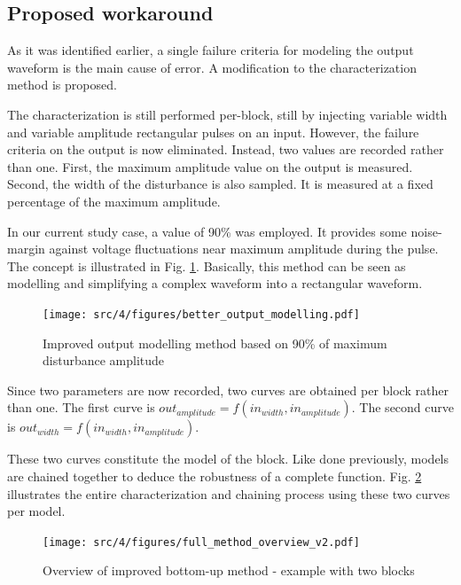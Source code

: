 \subsection{Proposed workaround}

As it was identified earlier, a single failure criteria for modeling the output waveform is the main cause of error.
A modification to the characterization method is proposed.

The characterization is still performed per-block, still by injecting variable width and variable amplitude rectangular pulses on an input.
However, the failure criteria on the output is now eliminated.
Instead, two values are recorded rather than one.
First, the maximum amplitude value on the output is measured.
Second, the width of the disturbance is also sampled.
It is measured at a fixed percentage of the maximum amplitude.

In our current study case, a value of 90\% was employed.
It provides some noise-margin against voltage fluctuations near maximum amplitude during the pulse.
The concept is illustrated in Fig. \ref{fig:impact-single-failure-criteria}.
Basically, this method can be seen as modelling and simplifying a complex waveform into a rectangular waveform.

\begin{figure}[!h]
  \centering
  \texttt{[image: src/4/figures/better\_output\_modelling.pdf]}
  \caption{Improved output modelling method based on 90\% of maximum disturbance amplitude}
  \label{fig:impact-single-failure-criteria}
\end{figure}

Since two parameters are now recorded, two curves are obtained per block rather than one.
The first curve is $out_{amplitude} = f(in_{width}, in_{amplitude})$.
The second curve is $out_{width} = f(in_{width}, in_{amplitude})$.

These two curves constitute the model of the block.
Like done previously, models are chained together to deduce the robustness of a complete function.
Fig. \ref{fig:full-method-v2} illustrates the entire characterization and chaining process using these two curves per model.

\begin{figure}[!hp]
  \centering
  \texttt{[image: src/4/figures/full\_method\_overview\_v2.pdf]}
  \caption{Overview of improved bottom-up method - example with two blocks}
  \label{fig:full-method-v2}
\end{figure}

